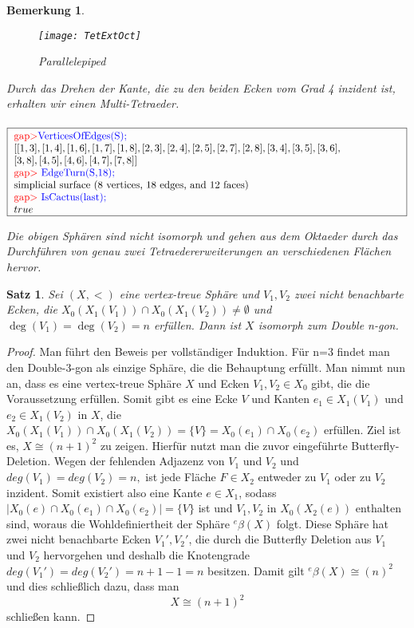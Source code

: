 \documentclass[12pt,titlepage,twoside,cleardoublepage]{article}
\theoremstyle{nummermitklammern}
\newtheorem{bemerkung}[temp]{Bemerkung}
\newtheorem{satz}[temp]{Satz}
\newtheorem{bemerkung}[zahl]{Bemerkung}
\newtheorem{satz}[zahl]{Satz}
\numberwithin{equation}{section}
\begin{document}
\begin{bemerkung}
\begin{itemize}
\begin{figure}[H]
\begin{center}
\texttt{[image: TetExtOct]}
\end{center}
\caption{Parallelepiped}
\end{figure}
Durch das Drehen der Kante, die zu den beiden Ecken vom Grad 4 inzident ist, erhalten wir einen Multi-Tetraeder.\\\\
$\fbox{
\parbox{13.4cm}{
\textcolor{red}{gap$>$}\textcolor{blue}{ VerticesOfEdges(S);}\newline
$[ [ 1, 3 ], [ 1, 4 ], [ 1, 6 ], [ 1, 7 ], [ 1, 8 ], [ 2, 3 ], [ 2, 4 ], [ 2, 5 ], [ 2, 7 ], [ 2, 8 ], [ 3, 4 ], [ 3, 5 ], [ 3, 6 ], \newline
 [ 3, 8 ],
  [ 4, 5 ], [ 4, 6 ], [ 4, 7 ], [ 7, 8 ] ]$\newline
\textcolor{red}{gap$>$} \textcolor{blue}{EdgeTurn(S,18);}\newline
simplicial surface (8 vertices, 18 edges, and 12 faces)\newline
\textcolor{red}{gap$>$} \textcolor{blue}{IsCactus(last);}\newline
$true$
}}$
\end{itemize}
Die obigen Sphären sind nicht isomorph und gehen aus dem Oktaeder durch das Durchführen von genau zwei Tetraedererweiterungen an verschiedenen Flächen hervor.  
\end{bemerkung}


\begin{satz}\label{ngon}
Sei $(X,<)$ eine vertex-treue Sphäre und $V_1,V_2$ zwei nicht benachbarte Ecken, die  $X_0(X_1(V_1))\cap X_0(X_1(V_2))\neq \emptyset$ und $\deg(V_1)=\deg(V_2)= n$ erfüllen. Dann ist $X$ isomorph zum Double n-gon.
\end{satz}
\begin{proof}
Man führt den Beweis per vollständiger Induktion. Für n=3 findet man den Double-3-gon als einzige Sphäre, die die Behauptung erfüllt. Man nimmt nun an, dass es eine vertex-treue Sphäre $X$ und Ecken $V_1,V_2\in X_0$ gibt, die die Voraussetzung erfüllen. Somit gibt es eine Ecke $V$ und Kanten $e_1\in X_1(V_1)$ und $e_2 \in X_1(V_2)$ in $X$, die $X_0(X_1(V_1))\cap X_0(X_1(V_2))=\{V\}=X_0(e_1)\cap X_0(e_2)$ erfüllen.
 Ziel ist es, $X\cong (n+1)^2$ zu zeigen. Hierfür nutzt man die zuvor eingeführte Butterfly-Deletion. Wegen der fehlenden Adjazenz von $V_1$ und $V_2$ und $deg(V_1)=deg(V_2)= n,$ ist jede Fläche $F\in X_2$ entweder zu $V_1$ oder zu $V_2$ inzident. Somit existiert also eine Kante $e\in X_1$, sodass $\vert X_0(e)\cap X_0(e_1)\cap X_0(e_2)\vert  =\{V\}$
 ist und $V_1,V_2$ in $X_0(X_2(e))$ enthalten sind, woraus die Wohldefiniertheit der Sphäre ${{}^e\beta(X)}$ folgt. Diese  Sphäre hat zwei nicht benachbarte Ecken $V_1',V_2'$, die durch die Butterfly Deletion aus $V_1$ und $V_2$ hervorgehen und deshalb die Knotengrade $deg(V_1')=deg(V_2')=n+1-1=n$ besitzen. Damit gilt ${{}^e\beta(X)}\cong (n)^2$ und dies schließlich dazu, dass man
 \[
X\cong (n+1)^2 
 \]
 schließen kann.
\end{proof}
\end{document}
